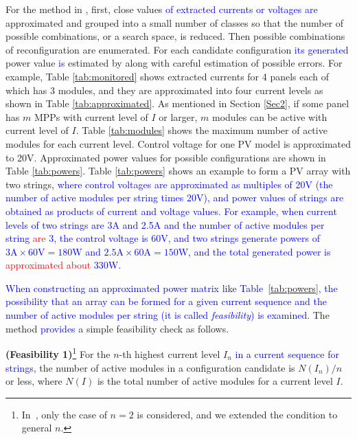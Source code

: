 \documentclass[conference]{pvsctran}
\newcommand{\michiko}{\textcolor{blue}}
\newcommand{\zhao}{\textcolor{red}}
\begin{document}
For the method in \cite{orozco2016optimized}, first, close values \michiko{of extracted currents or voltages are} approximated and grouped into a small number of classes so that the number of possible combinations, or a search space, is reduced.
Then possible combinations of reconfiguration are enumerated.
For each candidate configuration \michiko{its generated} power value \michiko{is} estimated by \cite{orozco2015fast} along with careful estimation of possible errors.
For example, Table \ref{tab:monitored} shows extracted currents for 4 panels each of which has 3 modules, and they are approximated into four current levels as shown in Table \ref{tab:approximated}. 
As mentioned in Section \ref{Sec2}, if some panel has $m$ MPPs with current level of $I$ or larger, $m$ modules can be active with current level of $I$. 
Table \ref{tab:modules} shows the maximum number of active modules for each current level.
Control voltage for one PV model is approximated to 20V.
Approximated power values for possible configurations are shown in Table \ref{tab:powers}. 
Table \ref{tab:powers} shows an example to form a PV array with two strings,
\michiko{where control voltages are approximated as multiples of 20V (the number of active modules per string times 20V), and power values of strings are obtained as products of current and voltage values. For example, when current levels of two strings are 3A and 2.5A and the number of active modules per string \zhao{are} 3, the control voltage is 60V, and two strings generate powers of $3\mbox{A} \times 60\mbox{V} = 180\mbox{W}$ and $2.5\mbox{A} \times 60\mbox{A} = 150\mbox{W}$, and the total generated power is \zhao{approximated about} 330W.}

\michiko{When constructing an approximated power matrix like Table~\ref{tab:powers}, the possibility that an array can be formed for a given current sequence and the number of active modules per string (it is called \textit{feasibility}) is examined.}
The method \michiko{provides} a simple feasibility check as follows. 

\textbf{(Feasibility 1)}\footnote{In~\cite{orozco2016optimized}, only the case of $n=2$ is considered, and we extended the condition to general $n$. }%
For the $n$-th highest current level $I_{n}$ \michiko{in a current sequence for strings}, the number of active modules in a configuration candidate is $N(I_{n}) / n$ or less,
where $N(I)$ is the total number of active modules for a current level $I$. 
\end{document}
